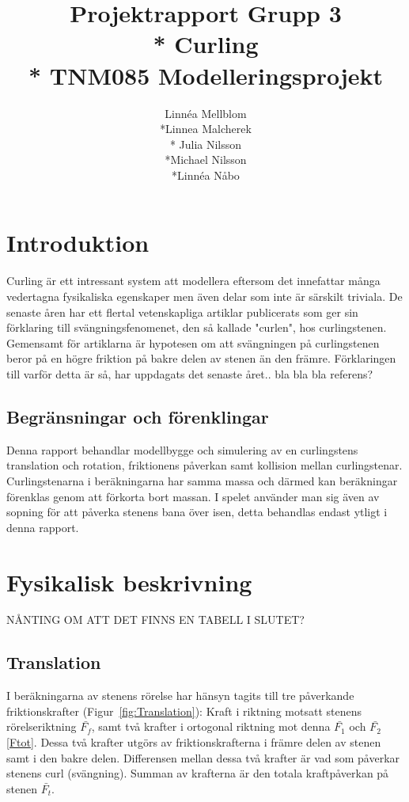 \documentclass[11pt]{article} %
\title{Projektrapport Grupp 3 \\* 
Curling\\*
TNM085 Modelleringsprojekt}
\author{Linnéa Mellblom\\*Linnea Malcherek\\* Julia Nilsson\\*Michael Nilsson\\*Linnéa Nåbo}
\begin{document}
\maketitle
\pagebreak
{}  

\pagebreak
\tableofcontents
\pagebreak

\section{Introduktion}
Curling är ett intressant system att modellera eftersom det innefattar många vedertagna fysikaliska egenskaper men även delar som inte är särskilt triviala. 
De senaste åren har ett flertal vetenskapliga artiklar publicerats som ger sin förklaring till svängningsfenomenet, den så kallade "curlen", hos curlingstenen.
Gemensamt för artiklarna är hypotesen om att svängningen på curlingstenen beror på en högre friktion på bakre delen av stenen än den främre. 
Förklaringen till varför detta är så, har uppdagats det senaste året.. bla bla bla referens?

\subsection{Begränsningar och förenklingar} 
 Denna rapport behandlar modellbygge och simulering av en curlingstens translation och rotation, friktionens påverkan samt kollision mellan curlingstenar. 
Curlingstenarna i beräkningarna har samma massa och därmed kan beräkningar förenklas genom att förkorta bort massan. 
I spelet använder man sig även av sopning för att påverka stenens bana över isen, detta behandlas endast ytligt i denna rapport. 

\section{Fysikalisk beskrivning} 

NÅNTING OM ATT DET FINNS EN TABELL I SLUTET?

\subsection{Translation}

I beräkningarna av stenens rörelse har hänsyn tagits till tre påverkande friktionskrafter (Figur~\ref{fig:Translation}): Kraft i riktning motsatt stenens rörelseriktning $\bar{F_f}$, samt två krafter i ortogonal riktning mot denna $\bar{F_1}$ och $\bar{F_2}$ \eqref{Ftot}. Dessa två krafter utgörs av friktionskrafterna i främre delen av stenen samt i den bakre delen. Differensen mellan dessa två krafter är vad som påverkar stenens curl (svängning). Summan av krafterna är den totala kraftpåverkan på stenen $\bar{F_t}$.
\end{document}
